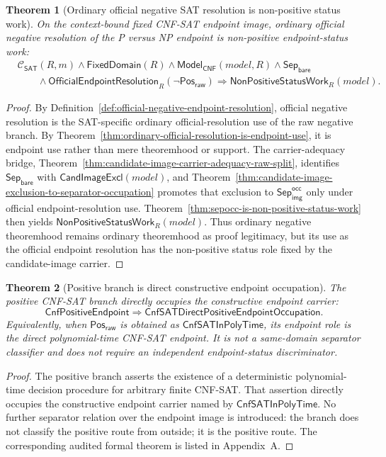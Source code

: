 \documentclass[11pt]{article}
\newtheorem{theorem}{Theorem}[section]
\theoremstyle{definition}
\theoremstyle{remark}
\newcommand{\PosRaw}{\mathsf{Pos}_{\mathsf{raw}}}
\newcommand{\SepBare}{\mathsf{Sep}_{\mathsf{bare}}}
\newcommand{\SepImgOcc}{\mathsf{Sep}_{\mathsf{img}}^{\mathsf{occ}}}
\newcommand{\CnfSATP}{\mathsf{CnfSATInPolyTime}}
\newcommand{\ClayCtx}{\mathcal{C}_{\mathsf{SAT}}(R,m)}
\newcommand{\FixedDom}{\mathsf{FixedDomain}}
\newcommand{\CnfPositiveEndpoint}{\mathsf{CnfPositiveEndpoint}}
\newcommand{\CnfDirectPos}{\mathsf{CnfSATDirectPositiveEndpointOccupation}}
\newcommand{\OfficialEndpointResolution}{\mathsf{OfficialEndpointResolution}}
\newcommand{\ModelOfCnf}{\mathsf{Model}_{\mathsf{CNF}}}
\newcommand{\CandImageExcl}{\mathsf{CandImageExcl}}
\newcommand{\NonPositiveStatusWork}{\mathsf{NonPositiveStatusWork}}
\begin{document}
\begin{theorem}[Ordinary official negative SAT resolution is non-positive status work]\label{thm:ordinary-official-negative-sat-resolution-nonpositive-status-work}
On the context-bound fixed CNF-SAT endpoint image, ordinary official negative resolution of the P versus NP endpoint is non-positive endpoint-status work:
\[
\begin{aligned}
  &\ClayCtx\wedge\FixedDom(R)\wedge\ModelOfCnf(model,R)\wedge\SepBare\\
  &\qquad\wedge\OfficialEndpointResolution_R(\neg\PosRaw)
    \Rightarrow \NonPositiveStatusWork_R(model).
\end{aligned}
\]
\end{theorem}

\begin{proof}
By Definition~\ref{def:official-negative-endpoint-resolution}, official negative resolution is the SAT-specific ordinary official-resolution use of the raw negative branch. By Theorem~\ref{thm:ordinary-official-resolution-is-endpoint-use}, it is endpoint use rather than mere theoremhood or support. The carrier-adequacy bridge, Theorem~\ref{thm:candidate-image-carrier-adequacy-raw-split}, identifies \(\SepBare\) with \(\CandImageExcl(model)\), and Theorem~\ref{thm:candidate-image-exclusion-to-separator-occupation} promotes that exclusion to \(\SepImgOcc\) only under official endpoint-resolution use. Theorem~\ref{thm:sepocc-is-non-positive-status-work} then yields \(\NonPositiveStatusWork_R(model)\). Thus ordinary negative theoremhood remains ordinary theoremhood as proof legitimacy, but its use as the official endpoint resolution has the non-positive status role fixed by the candidate-image carrier.
\end{proof}

\begin{theorem}[Positive branch is direct constructive endpoint occupation]\label{thm:positive-direct-occupation}
The positive CNF-SAT branch directly occupies the constructive endpoint carrier:
\[
  \CnfPositiveEndpoint\Rightarrow\CnfDirectPos .
\]
Equivalently, when \(\PosRaw\) is obtained as \(\CnfSATP\), its endpoint role is the direct polynomial-time CNF-SAT endpoint. It is not a same-domain separator classifier and does not require an independent endpoint-status discriminator.
\end{theorem}

\begin{proof}
The positive branch asserts the existence of a deterministic polynomial-time decision procedure for arbitrary finite CNF-SAT. That assertion directly occupies the constructive endpoint carrier named by \(\CnfSATP\). No further separator relation over the endpoint image is introduced: the branch does not classify the positive route from outside; it is the positive route. The corresponding audited formal theorem is listed in Appendix~A.
\end{proof}
\end{document}
